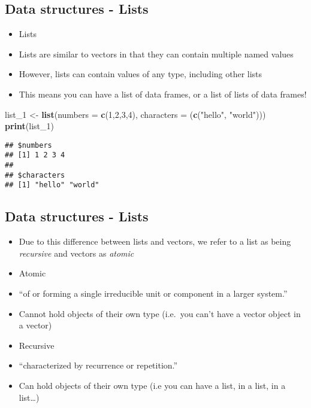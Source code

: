 \documentclass[]{article}
\newenvironment{Shaded}{\begin{snugshade}}{\end{snugshade}}
\newcommand{\KeywordTok}[1]{\textcolor[rgb]{0.13,0.29,0.53}{\textbf{#1}}}
\newcommand{\DataTypeTok}[1]{\textcolor[rgb]{0.13,0.29,0.53}{#1}}
\newcommand{\DecValTok}[1]{\textcolor[rgb]{0.00,0.00,0.81}{#1}}
\newcommand{\StringTok}[1]{\textcolor[rgb]{0.31,0.60,0.02}{#1}}
\newcommand{\NormalTok}[1]{#1}
\providecommand{\tightlist}{%
  \setlength{\itemsep}{0pt}\setlength{\parskip}{0pt}}
\begin{document}
\subsection{Data structures - Lists}\label{data-structures---lists}

\begin{itemize}
\tightlist
\item
  Lists
\item
  Lists are similar to vectors in that they can contain multiple named
  values
\item
  However, lists can contain values of any type, including other lists
\item
  This means you can have a list of data frames, or a list of lists of
  data frames!
\end{itemize}

\begin{Shaded}
\begin{Highlighting}[]
\NormalTok{list_}\DecValTok{1}\NormalTok{ <-}\StringTok{ }\KeywordTok{list}\NormalTok{(}\DataTypeTok{numbers =} \KeywordTok{c}\NormalTok{(}\DecValTok{1}\NormalTok{,}\DecValTok{2}\NormalTok{,}\DecValTok{3}\NormalTok{,}\DecValTok{4}\NormalTok{), }\DataTypeTok{characters =}\NormalTok{ (}\KeywordTok{c}\NormalTok{(}\StringTok{"hello"}\NormalTok{, }\StringTok{"world"}\NormalTok{)))}
\KeywordTok{print}\NormalTok{(list_}\DecValTok{1}\NormalTok{)}
\end{Highlighting}
\end{Shaded}

\begin{verbatim}
## $numbers
## [1] 1 2 3 4
## 
## $characters
## [1] "hello" "world"
\end{verbatim}

\subsection{Data structures - Lists}\label{data-structures---lists-1}

\begin{itemize}
\tightlist
\item
  Due to this difference between lists and vectors, we refer to a list
  as being \emph{recursive} and vectors as \emph{atomic}
\item
  Atomic
\item
  ``of or forming a single irreducible unit or component in a larger
  system.''
\item
  Cannot hold objects of their own type (i.e.~you can't have a vector
  object in a vector)
\item
  Recursive
\item
  ``characterized by recurrence or repetition.''
\item
  Can hold objects of their own type (i.e you can have a list, in a
  list, in a list\ldots{})
\end{itemize}
\end{document}
